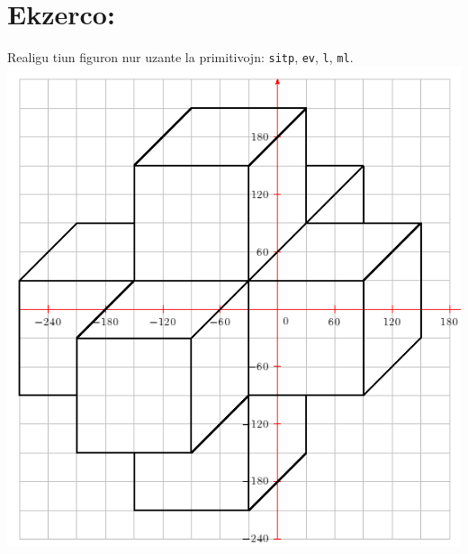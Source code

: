 \section{Ekzerco:}
\noindent
Realigu tiun figuron nur uzante la primitivojn: \texttt{sitp}, \texttt{ev}, \texttt{l}, \texttt{ml}.\\
\includegraphics[scale=0.7]{bildoj/fpos-cube.png}
